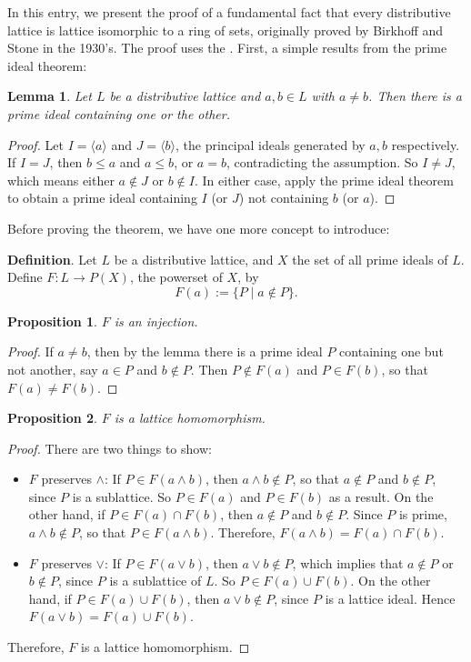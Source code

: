 \documentclass[12pt]{article}
\newtheorem{prop}{Proposition}
\newtheorem{lem}{Lemma}
\begin{document}
In this entry, we present the proof of a fundamental fact that every distributive lattice is lattice isomorphic to a ring of sets, originally proved by Birkhoff and Stone in the 1930's.  The proof uses the .  First, a simple results from the prime ideal theorem:

\begin{lem} Let $L$ be a distributive lattice and $a,b\in L$ with $a\ne b$.  Then there is a prime ideal containing one or the other. \end{lem}
\begin{proof}  Let $I=\langle a\rangle$ and $J=\langle b\rangle$, the principal ideals generated by $a,b$ respectively.  If $I=J$, then $b\le a$ and $a\le b$, or $a=b$, contradicting the assumption.  So $I\ne J$, which means either $a\notin J$ or $b\notin I$.  In either case, apply the prime ideal theorem to obtain a prime ideal containing $I$ (or $J$) not containing $b$ (or $a$).
\end{proof}

Before proving the theorem, we have one more concept to introduce:

\textbf{Definition}.  Let $L$ be a distributive lattice, and $X$ the set of all prime ideals of $L$.  Define $F: L\to P(X)$, the powerset of $X$, by $$F(a):=\lbrace P\mid a\notin P\rbrace.$$

\begin{prop} $F$ is an injection. \end{prop}
\begin{proof} If $a\ne b$, then by the lemma there is a prime ideal $P$ containing one but not another, say $a\in P$ and $b\notin P$.  Then $P\notin F(a)$ and $P\in F(b)$, so that $F(a)\ne F(b)$. \end{proof}

\begin{prop} $F$ is a lattice homomorphism. \end{prop}
\begin{proof} There are two things to show:
\begin{itemize}
\item $F$ preserves $\wedge$: If $P\in F(a\wedge b)$, then $a\wedge b\notin P$, so that $a\notin P$ and $b\notin P$, since $P$ is a sublattice.  So $P\in F(a)$ and $P\in F(b)$ as a result.  On the other hand, if $P\in F(a)\cap F(b)$, then $a\notin P$ and $b\notin P$.  Since $P$ is prime, $a\wedge b\notin P$, so that $P\in F(a\wedge b)$.  Therefore, $F(a\wedge b)=F(a)\cap F(b)$.
\item $F$ preserves $\vee$: If $P\in F(a\vee b)$, then $a\vee b\notin P$, which implies that $a\notin P$ or $b\notin P$, since $P$ is a sublattice of $L$.  So $P\in F(a)\cup F(b)$.  On the other hand, if $P\in F(a)\cup F(b)$, then $a\vee b\notin P$, since $P$ is a lattice ideal.  Hence $F(a\vee b)=F(a)\cup F(b)$.
\end{itemize}
Therefore, $F$ is a lattice homomorphism.
\end{proof}
\end{document}
